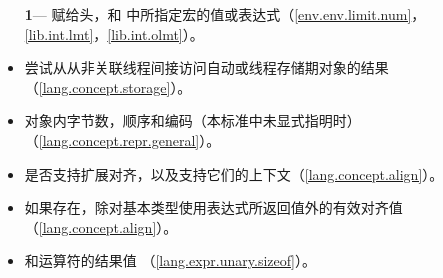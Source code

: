 \begin{itemize} %
  \item[\textbf{1}\hspace{5pt}---]{赋给头，和
    中所指定宏的值或表达式（\ref{env.env.limit.num}，
    \ref{lib.int.lmt}，\ref{lib.int.olmt}）。}
  \item{尝试从从非关联线程间接访问自动或线程存储期对象的结果
    （\ref{lang.concept.storage}）。}
  \item{对象内字节数，顺序和编码（本标准中未显式指明时）
    （\ref{lang.concept.repr.general}）。}
  \item{是否支持扩展对齐，以及支持它们的上下文（\ref{lang.concept.align}）。}
  \item{如果存在，除对基本类型使用表达式所返回值外的有效对齐值
    （\ref{lang.concept.align}）。}
  \item{和运算符的结果值
    （\ref{lang.expr.unary.sizeof}）。}
\end{itemize}

